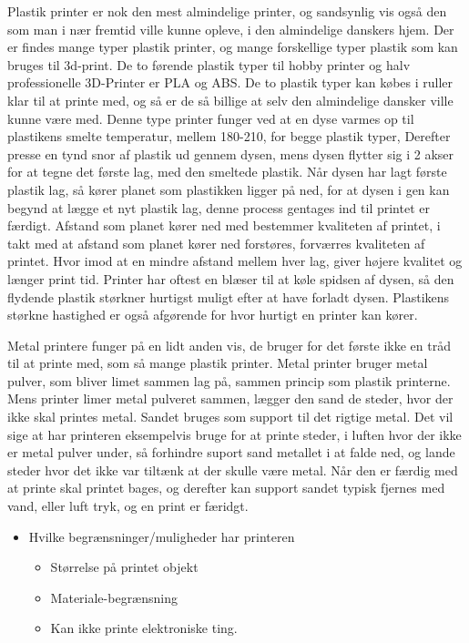 Plastik printer er nok den mest almindelige printer, og sandsynlig vis også den som man i nær fremtid ville kunne opleve, i den almindelige danskers hjem. Der er findes mange typer plastik printer, og mange forskellige typer plastik som kan bruges til 3d-print. De to førende plastik typer til hobby printer og halv professionelle 3D-Printer er PLA og ABS. De to plastik typer kan købes i ruller klar til at printe med, og så er de så billige at selv den almindelige dansker ville kunne være med. 
Denne type printer funger ved at en dyse varmes op til plastikens smelte temperatur, mellem 180-210, for begge plastik typer, Derefter presse en tynd snor af plastik ud gennem dysen, mens dysen flytter sig i 2 akser for at tegne det første lag, med den smeltede plastik. Når dysen har lagt første plastik lag, så kører planet som plastikken ligger på ned, for at dysen i gen kan begynd at lægge et nyt plastik lag, denne process gentages ind til printet er færdigt. Afstand som planet kører ned med bestemmer kvaliteten af printet, i takt med at afstand som planet kører ned forstøres, forværres kvaliteten af printet.  Hvor imod at en mindre afstand mellem hver lag, giver højere kvalitet og længer print tid. Printer har oftest en blæser til at køle spidsen af dysen, så den flydende plastik størkner hurtigst muligt efter at have forladt dysen. Plastikens størkne hastighed er også afgørende for hvor hurtigt en printer kan kører. 

Metal printere funger på en lidt anden vis, de bruger for det første ikke en tråd til at printe med, som så mange plastik printer. Metal printer bruger metal pulver, som bliver limet sammen lag på, sammen princip som plastik printerne. 
Mens printer limer metal pulveret sammen, lægger den sand de steder, hvor der ikke skal printes metal. Sandet bruges som support til det rigtige metal. Det vil sige at har printeren eksempelvis bruge for at printe steder, i luften hvor der ikke er metal pulver under, så forhindre suport sand metallet i at falde ned, og lande steder hvor det ikke var tiltænk at der skulle være metal.
Når den er færdig med at printe skal printet bages, og derefter kan support sandet typisk fjernes med vand, eller luft tryk, og en print er færidgt.

\begin{itemize}
	\item Hvilke begrænsninger/muligheder har printeren
	\begin{itemize}
		\item Størrelse på printet objekt
		\item Materiale-begrænsning
		\item Kan ikke printe elektroniske ting.
	\end{itemize}
\end{itemize}

